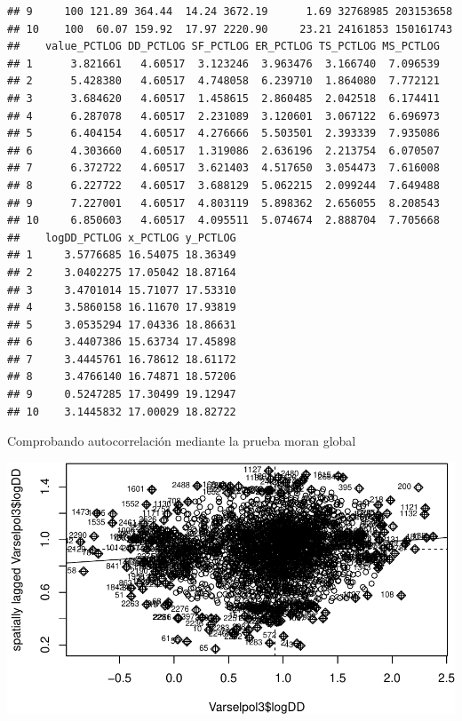 \documentclass[11pt,]{article}
\newenvironment{Shaded}{\begin{snugshade}}{\end{snugshade}}
\newcommand{\KeywordTok}[1]{\textcolor[rgb]{0.13,0.29,0.53}{\textbf{#1}}}
\newcommand{\OperatorTok}[1]{\textcolor[rgb]{0.81,0.36,0.00}{\textbf{#1}}}
\newcommand{\NormalTok}[1]{#1}
\begin{document}
\begin{verbatim}
## 9     100 121.89 364.44  14.24 3672.19      1.69 32768985 203153658
## 10    100  60.07 159.92  17.97 2220.90     23.21 24161853 150161743
##    value_PCTLOG DD_PCTLOG SF_PCTLOG ER_PCTLOG TS_PCTLOG MS_PCTLOG
## 1      3.821661   4.60517  3.123246  3.963476  3.166740  7.096539
## 2      5.428380   4.60517  4.748058  6.239710  1.864080  7.772121
## 3      3.684620   4.60517  1.458615  2.860485  2.042518  6.174411
## 4      6.287078   4.60517  2.231089  3.120601  3.067122  6.696973
## 5      6.404154   4.60517  4.276666  5.503501  2.393339  7.935086
## 6      4.303660   4.60517  1.319086  2.636196  2.213754  6.070507
## 7      6.372722   4.60517  3.621403  4.517650  3.054473  7.616008
## 8      6.227722   4.60517  3.688129  5.062215  2.099244  7.649488
## 9      7.227001   4.60517  4.803119  5.898362  2.656055  8.208543
## 10     6.850603   4.60517  4.095511  5.074674  2.888704  7.705668
##    logDD_PCTLOG x_PCTLOG y_PCTLOG
## 1     3.5776685 16.54075 18.36349
## 2     3.0402275 17.05042 18.87164
## 3     3.4701014 15.71077 17.53310
## 4     3.5860158 16.11670 17.93819
## 5     3.0535294 17.04336 18.86631
## 6     3.4407386 15.63734 17.45898
## 7     3.4445761 16.78612 18.61172
## 8     3.4766140 16.74871 18.57206
## 9     0.5247285 17.30499 19.12947
## 10    3.1445832 17.00029 18.82722
\end{verbatim}

Comprobando autocorrelación mediante la prueba moran global

\begin{Shaded}
\end{Shaded}

\includegraphics{proyecto_f_files/figure-latex/unnamed-chunk-74-1.pdf}
\end{document}
